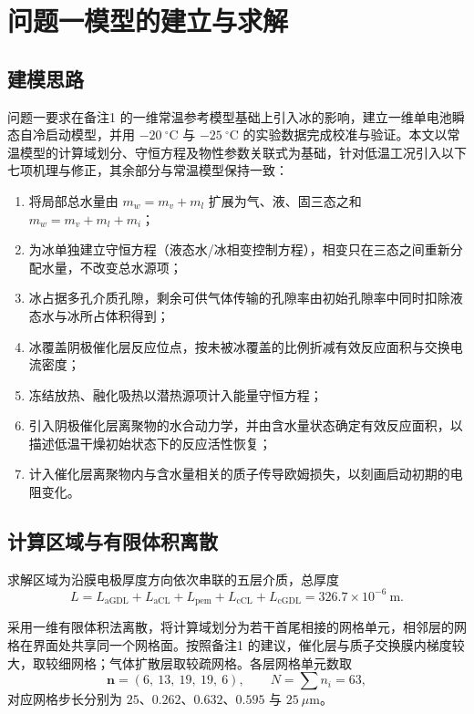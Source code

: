 \documentclass{gmcmthesis}
\begin{document}
\section{问题一模型的建立与求解}
\label{sec:model1}

\subsection{建模思路}

问题一要求在备注1 的一维常温参考模型基础上引入冰的影响，建立一维单电池瞬态自冷启动模型，并用 $-20~^{\circ}\mathrm{C}$ 与 $-25~^{\circ}\mathrm{C}$ 的实验数据完成校准与验证。本文以常温模型的计算域划分、守恒方程及物性参数关联式为基础，针对低温工况引入以下七项机理与修正，其余部分与常温模型保持一致：

\begin{enumerate}
  \item 将局部总水量由 $m_w=m_v+m_l$ 扩展为气、液、固三态之和 $m_w=m_v+m_l+m_i$；
  \item 为冰单独建立守恒方程（液态水/冰相变控制方程），相变只在三态之间重新分配水量，不改变总水源项；
  \item 冰占据多孔介质孔隙，剩余可供气体传输的孔隙率由初始孔隙率中同时扣除液态水与冰所占体积得到；
  \item 冰覆盖阴极催化层反应位点，按未被冰覆盖的比例折减有效反应面积与交换电流密度；
  \item 冻结放热、融化吸热以潜热源项计入能量守恒方程；
  \item 引入阴极催化层离聚物的水合动力学，并由含水量状态确定有效反应面积，以描述低温干燥初始状态下的反应活性恢复；
  \item 计入催化层离聚物内与含水量相关的质子传导欧姆损失，以刻画启动初期的电阻变化。
\end{enumerate}

\subsection{计算区域与有限体积离散}

求解区域为沿膜电极厚度方向依次串联的五层介质，总厚度
\begin{equation}
  L=L_{\mathrm{aGDL}}+L_{\mathrm{aCL}}+L_{\mathrm{pem}}+L_{\mathrm{cCL}}+L_{\mathrm{cGDL}}
  =326.7\times10^{-6}~\mathrm{m}.
  \label{eq:domain}
\end{equation}

采用一维有限体积法离散，将计算域划分为若干首尾相接的网格单元，相邻层的网格在界面处共享同一个网格面。按照备注1 的建议，催化层与质子交换膜内梯度较大，取较细网格；气体扩散层取较疏网格。各层网格单元数取
\begin{equation}
  \bm{n}=(6,~13,~19,~19,~6),\qquad N=\sum n_i=63,
  \label{eq:grid}
\end{equation}
对应网格步长分别为 $25$、$0.262$、$0.632$、$0.595$ 与 $25~\mu\mathrm{m}$。
\end{document}
